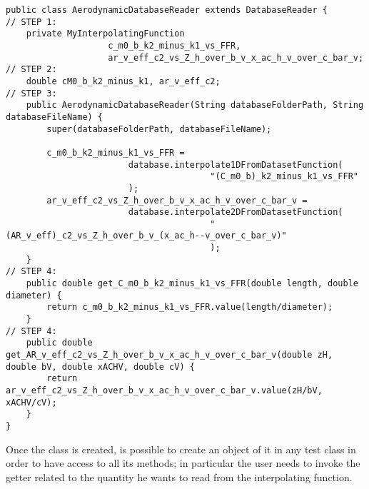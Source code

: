 \bigskip
\lstset{language=Java}
\begin{lstlisting}[caption={DatabaseReader son class creation}, captionpos=b, tabsize=2]
public class AerodynamicDatabaseReader extends DatabaseReader {
// STEP 1:
	private MyInterpolatingFunction 
					c_m0_b_k2_minus_k1_vs_FFR,
					ar_v_eff_c2_vs_Z_h_over_b_v_x_ac_h_v_over_c_bar_v;
// STEP 2:
	double cM0_b_k2_minus_k1, ar_v_eff_c2;
// STEP 3:
	public AerodynamicDatabaseReader(String databaseFolderPath, String databaseFileName) {
		super(databaseFolderPath, databaseFileName);

		c_m0_b_k2_minus_k1_vs_FFR = 
						database.interpolate1DFromDatasetFunction(
										"(C_m0_b)_k2_minus_k1_vs_FFR"
						);
		ar_v_eff_c2_vs_Z_h_over_b_v_x_ac_h_v_over_c_bar_v =
						database.interpolate2DFromDatasetFunction(
										"(AR_v_eff)_c2_vs_Z_h_over_b_v_(x_ac_h--v_over_c_bar_v)"
										);
	}
// STEP 4:	
	public double get_C_m0_b_k2_minus_k1_vs_FFR(double length, double diameter) { 
		return c_m0_b_k2_minus_k1_vs_FFR.value(length/diameter);
	}
// STEP 4:
	public double get_AR_v_eff_c2_vs_Z_h_over_b_v_x_ac_h_v_over_c_bar_v(double zH, double bV, double xACHV, double cV) {
		return ar_v_eff_c2_vs_Z_h_over_b_v_x_ac_h_v_over_c_bar_v.value(zH/bV, xACHV/cV);
	}
}
\end{lstlisting}
%
\bigskip
\noindent
Once the class is created, is possible to create an object of it in any test class in order to have access to all its methods; in particular the user needs to invoke the getter related to the quantity he wants to read from the interpolating function. 